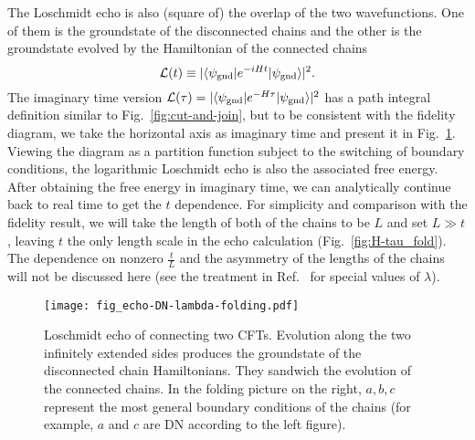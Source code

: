 The Loschmidt echo is also (square of) the overlap of the two wavefunctions. One of them is the groundstate of the disconnected chains and the other is the groundstate evolved by the Hamiltonian of the connected chains
\begin{equation}
\mathcal{L}( t )  \equiv |\langle \psi_{\rm gnd}  | e^{-i H t } | \psi_{\rm gnd} \rangle|^2 .
\end{equation}
The imaginary time version $\mathcal{L}( \tau  ) = |\langle \psi_{\rm gnd}  | e^{-H \tau } | \psi_{\rm gnd} \rangle|^2$ has a path integral definition similar to Fig.~\ref{fig:cut-and-join}, but to be consistent with the fidelity diagram, we take the horizontal axis as imaginary time and present it in Fig.~\ref{fig:echo}. Viewing the diagram as a partition function subject to the switching of boundary conditions, the logarithmic Loschmidt echo is also the associated free energy. After obtaining the free energy in imaginary time, we can analytically continue back to real time to get the $t$ dependence. For simplicity and comparison with the fidelity result, we will take the length of both of the chains to be $L$ and set $L \gg t$, leaving $t$ the only length scale in the echo calculation (Fig.~\ref{fig:H-tau_fold}). The dependence on nonzero $\frac{t}{L}$ and the asymmetry of the lengths of the chains will not be discussed here (see the treatment in Ref.~ for special values of $\lambda$).

\begin{figure}[h]
\centering
\texttt{[image: fig\_echo-DN-lambda-folding.pdf]}
\caption{Loschmidt echo of connecting two CFTs. Evolution along the two infinitely extended sides produces the groundstate of the disconnected chain Hamiltonians. They sandwich the evolution of the connected chains. In the folding picture on the right, $a,b,c$ represent the most general boundary conditions of the chains (for example, $a$ and $c$ are DN according to the left figure).}
\label{fig:echo}
\end{figure}

